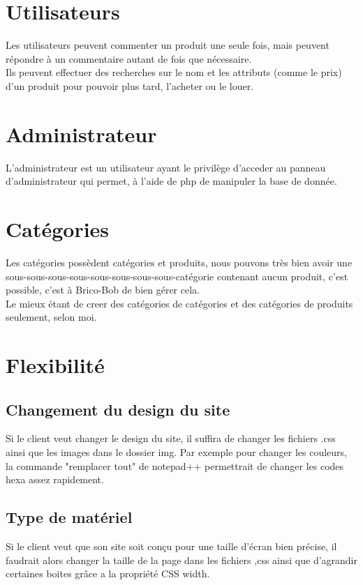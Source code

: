 \section{Utilisateurs}
			Les utilisateurs peuvent commenter un produit une seule fois, mais peuvent répondre à un commentaire autant de fois que nécessaire.\\
			Ils peuvent effectuer des recherches sur le nom et les attributs (comme le prix) d'un produit pour pouvoir plus tard, l'acheter ou le louer.\\
			
		\section{Administrateur}
			L'administrateur est un utilisateur ayant le privilège d'acceder au panneau d'administrateur qui permet, à l'aide de php de manipuler la base de donnée.
		
		\section{Catégories}
			Les catégories possèdent catégories et produits, nous pouvons très bien avoir une sous-sous-sous-sous-sous-sous-sous-sous-catégorie contenant aucun produit, c'est possible, c'est à Brico-Bob de bien gérer cela.\\
			Le mieux étant de creer des catégories de catégories et des catégories de produits seulement, selon moi.
		\section{Flexibilité}
	
			\subsection{Changement du design du site}
	Si le client veut changer le design du site, il suffira de changer les fichiers .css ainsi que les images dans le dossier img. Par exemple pour changer les couleurs, la commande "remplacer tout" de notepad++ permettrait de changer les codes hexa assez rapidement.

\subsection{Type de matériel}
	Si le client veut que son site soit conçu pour une taille d'écran bien précise, il faudrait alors changer la taille de la page dans les fichiers ,css ainsi que d'agrandir certaines boites grâce a la propriété CSS width.

